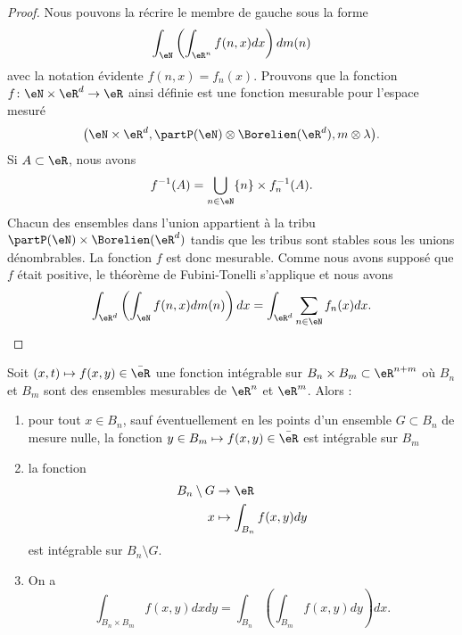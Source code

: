 \begin{proof}
	Nous pouvons la récrire le membre de gauche sous la forme
	\begin{equation}
		\int_{\eN}\left( \int_{\eR^n}f(n,x)dx \right)dm(n)
	\end{equation}
	avec la notation évidente \( f(n,x)=f_n(x)\). Prouvons que la fonction \( f\colon \eN\times\eR^d\to \eR\) ainsi définie est une fonction mesurable pour l'espace mesuré
	\begin{equation}
		\big( \eN\times\eR^d,\partP(\eN)\otimes\Borelien(\eR^d),m\otimes\lambda \big).
	\end{equation}
	Si \( A\subset\eR\), nous avons
	\begin{equation}
		f^{-1}(A)=\bigcup_{n\in\eN}\{ n \}\times f_n^{-1}(A).
	\end{equation}
	Chacun des ensembles dans l'union appartient à la tribu \( \partP(\eN)\times\Borelien(\eR^d)\) tandis que les tribus sont stables sous les unions dénombrables. La fonction \( f\) est donc mesurable. Comme nous avons supposé que \( f\) était positive, le théorème de Fubini-Tonelli s'applique et nous avons
	\begin{equation}
		\int_{\eR^d}\left( \int_{\eN}f(n,x)dm(n) \right)dx=\int_{\eR^d}\sum_{n\in \eN}f_n(x)dx.
	\end{equation}
\end{proof}

\begin{theorem}[Fubini]\label{ThoFubini}
	Soit \( (x,t)\mapsto f(x,y)\in\bar \eR\) une fonction intégrable sur \( B_n\times B_m\subset\eR^{n+m}\) où \( B_n\) et \( B_m\) sont des ensembles mesurables de \( \eR^n\) et \( \eR^m\). Alors :
	\begin{enumerate}
		\item pour tout \( x\in B_n\), sauf éventuellement en les points d'un ensemble \( G\subset B_n\) de mesure nulle, la fonction \( y\in B_m\mapsto f(x,y)\in\bar\eR\) est intégrable sur \( B_m\)
		\item
		      la fonction
		      \begin{equation}
			      \begin{aligned}
				      B_n\setminus G & \to \eR                    \\
				      x              & \mapsto \int_{B_n}f(x,y)dy
			      \end{aligned}
		      \end{equation}
		      est intégrable sur \( B_n\setminus G\).
		\item
		      On a
		      \begin{equation}
			      \int_{B_n\times B_m}f(x,y)dxdy=\int_{B_n}\left( \int_{B_m}f(x,y)dy \right)dx.
		      \end{equation}

	\end{enumerate}
\end{theorem}

